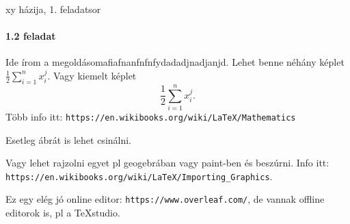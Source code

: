 \documentclass{article}
\begin{document}
\begin{center}
	xy házija, 1. feladatsor
\end{center}

\paragraph{1.2 feladat}
Ide írom a megoldásomafiafnanfnfnfydadadjnadjanjd.
Lehet benne néhány képlet $\frac{1}{2}\sum_{i=1}^n x_i^j$.
Vagy kiemelt képlet $$\frac{1}{2}\sum_{i=1}^n x_i^j.$$
Több info itt: \verb|https://en.wikibooks.org/wiki/LaTeX/Mathematics|

\bigskip


Esetleg ábrát is lehet csinálni.



\bigskip
Vagy lehet rajzolni egyet pl geogebrában vagy paint-ben és beszúrni. Info itt: \verb|https://en.wikibooks.org/wiki/LaTeX/Importing_Graphics|.

\vspace{2cm}
Ez egy elég jó online editor: \verb|https://www.overleaf.com/|, de vannak offline editorok is, pl a TeXstudio.
\end{document}
